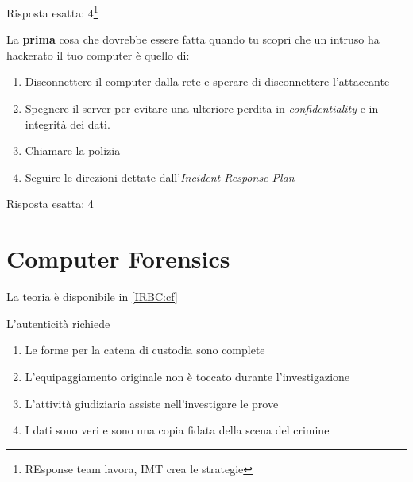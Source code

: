 \begin{Answer} [
  ref={esIRBC5},
  number={5}
  ]

  \Question Risposta esatta: 4\footnote{REsponse team lavora, IMT crea le
strategie}
\end{Answer}


\begin{Exercise} [
  title={Quiz},
  label={esIRBC6}
  ]

  \Question La \textbf{prima} cosa che dovrebbe essere fatta quando tu scopri
che un intruso ha hackerato il tuo computer \`e quello di:
\begin{enumerate}
 \item Disconnettere il computer dalla rete e sperare di disconnettere
l'attaccante
 \item Spegnere il server per evitare una ulteriore perdita in
\textit{confidentiality} e in integrit\`a dei dati.
 \item Chiamare la polizia
 \item Seguire le direzioni dettate dall'\textit{Incident Response Plan}
\end{enumerate}
\end{Exercise}

\begin{Answer} [
  ref={esIRBC6},
  number={6}
  ]

  \Question Risposta esatta: 4
\end{Answer}

\section{Computer Forensics}
\label{esIRBC:cf}

La teoria \`e disponibile in \ref{IRBC:cf}



\begin{Exercise} [
  title={Quiz},
  label={esIRBC7}
  ]

  \Question L'autenticità richiede
  \begin{enumerate}
   \item Le forme per la catena di custodia sono complete
   \item L'equipaggiamento originale non \`e toccato durante l'investigazione
   \item L'attivit\`a giudiziaria assiste nell'investigare le prove
   \item I dati sono veri e sono una copia fidata della scena del crimine
  \end{enumerate}
\end{Exercise}

